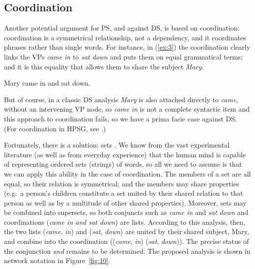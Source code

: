 \documentclass[output=paper
 	        ,biblatex
                ,babelshorthands
                ,newtxmath
                ,draftmode
                ,colorlinks, citecolor=brown
]{langscibook}
\begin{document}
\subsection{Coordination}
\label{sec:4.2}

Another potential argument for PS, and against DS, is based on coordination: coordination is a
symmetrical relationship, not a dependency, and it coordinates phrases rather than single words. For
instance, in (\ref{ex:3}) the coordination clearly links the VPs \emph{came in} to \emph{sat down}
and puts them on equal grammatical terms; and it is this equality that allows them to share the
subject \emph{Mary}.

\begin{exe}
	\ex \label{ex:3} Mary came in and sat down.
\end{exe}
%
But of course, in a classic DS analysis \emph{Mary} is also attached directly to \emph{came},
without an intervening VP node, so \emph{came in} is not a complete syntactic item and this approach
to coordination fails, so we have a prima facie case against DS. (For coordination in HPSG, see
.)

Fortunately, there is a solution: sets \citep[404--421]{Hudson90a-u}. We know from the vast
experimental literature (as well as from everyday experience) that the human mind is capable of
representing ordered sets (strings) of words, so all we need to assume is that we can apply this
ability in the case of coordination. The members of a set are all equal, so their relation is
symmetrical; and the members may share properties (e.g.\ a person's children constitute a set united
by their shared relation to that person as well as by a multitude of other shared
properties). Moreover, sets may be combined into supersets, so both conjuncts such as \emph{came in}
and \emph{sat down} and coordinations (\emph{came in and sat down}) are lists. According to
this analysis, then, the two lists (\emph{came}, \emph{in}) and (\emph{sat}, \emph{down}) are united
by their shared subject, Mary, and combine into the coordination ((\emph{came}, \emph{in})
(\emph{sat}, \emph{down})). The precise status of the conjunction \emph{and} remains to be
determined. The proposed analysis is shown in network notation in Figure~\ref{fig:10}.
\end{document}
